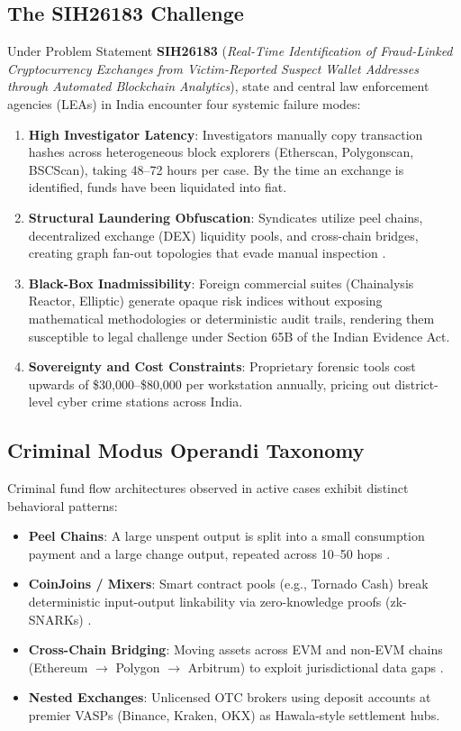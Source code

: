 \documentclass[10pt,twocolumn,a4paper]{article}
\begin{document}
\subsection{The SIH26183 Challenge}
Under Problem Statement \textbf{SIH26183} (\textit{Real-Time Identification of Fraud-Linked Cryptocurrency Exchanges from Victim-Reported Suspect Wallet Addresses through Automated Blockchain Analytics}), state and central law enforcement agencies (LEAs) in India encounter four systemic failure modes:
\begin{enumerate}[leftmargin=*]
    \item \textbf{High Investigator Latency}: Investigators manually copy transaction hashes across heterogeneous block explorers (Etherscan, Polygonscan, BSCScan), taking 48--72 hours per case. By the time an exchange is identified, funds have been liquidated into fiat.
    \item \textbf{Structural Laundering Obfuscation}: Syndicates utilize peel chains, decentralized exchange (DEX) liquidity pools, and cross-chain bridges, creating graph fan-out topologies that evade manual inspection \cite{moser2018anonymous}.
    \item \textbf{Black-Box Inadmissibility}: Foreign commercial suites (Chainalysis Reactor, Elliptic) generate opaque risk indices without exposing mathematical methodologies or deterministic audit trails, rendering them susceptible to legal challenge under Section 65B of the Indian Evidence Act.
    \item \textbf{Sovereignty and Cost Constraints}: Proprietary forensic tools cost upwards of \$30,000--\$80,000 per workstation annually, pricing out district-level cyber crime stations across India.
\end{enumerate}

\subsection{Criminal Modus Operandi Taxonomy}
Criminal fund flow architectures observed in active cases exhibit distinct behavioral patterns:
\begin{itemize}[leftmargin=*]
    \item \textbf{Peel Chains}: A large unspent output is split into a small consumption payment and a large change output, repeated across 10--50 hops \cite{meiklejohn2013fistful}.
    \item \textbf{CoinJoins / Mixers}: Smart contract pools (e.g., Tornado Cash) break deterministic input-output linkability via zero-knowledge proofs (zk-SNARKs) \cite{biryukov2019deanonymization}.
    \item \textbf{Cross-Chain Bridging}: Moving assets across EVM and non-EVM chains (Ethereum $\to$ Polygon $\to$ Arbitrum) to exploit jurisdictional data gaps \cite{elliptic2023typhoon}.
    \item \textbf{Nested Exchanges}: Unlicensed OTC brokers using deposit accounts at premier VASPs (Binance, Kraken, OKX) as Hawala-style settlement hubs.
\end{itemize}
\end{document}

